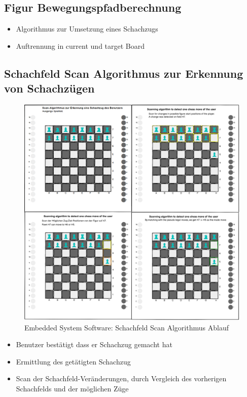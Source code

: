 \hypertarget{figur-bewegungspfadberechnung}{%
\subsection{Figur
Bewegungspfadberechnung}\label{figur-bewegungspfadberechnung}}

\begin{itemize}
\tightlist
\item
  Algorithmus zur Umsetzung eines Schachzugs
\item
  Auftrennung in current und target Board
\end{itemize}

\hypertarget{schachfeld-scan-algorithmus-zur-erkennung-von-schachzuxfcgen}{%
\subsection{Schachfeld Scan Algorithmus zur Erkennung von
Schachzügen}\label{schachfeld-scan-algorithmus-zur-erkennung-von-schachzuxfcgen}}

\begin{figure}
\centering
\includegraphics{images/ATC_ChessMoveAlgorithm.png}
\caption{Embedded System Software: Schachfeld Scan Algorithmus Ablauf}
\end{figure}

\begin{itemize}
\tightlist
\item
  Benutzer bestätigt dass er Schachzug gemacht hat
\item
  Ermittlung des getätigten Schachzug
\item
  Scan der Schachfeld-Veränderungen, durch Vergleich des vorherigen
  Schachfelds und der möglichen Züge
\end{itemize}

